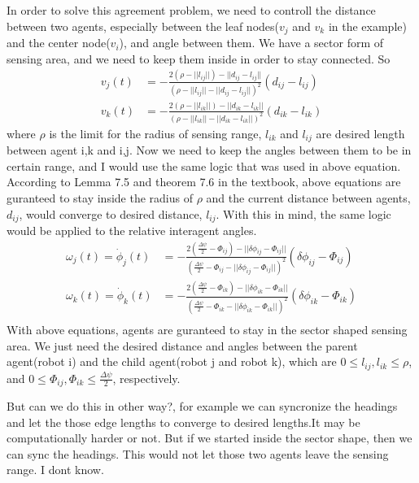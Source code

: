 \documentclass{article}
\begin{document}
\begin{problem}
    \vspace{12pt}
    In order to solve this agreement problem, we need to controll the distance between two agents, especially between the leaf nodes($v_j$ and $v_k$ in the example) and the center node($v_i$), and angle between them. We have a sector form of sensing area, and we need to keep them inside in order to stay connected. So 
    \begin{align*}
        v_j(t) &= - \frac{2(\rho - ||l_{ij}||) - ||d_{ij} - l_{ij}||}{(\rho - ||l_{ij}|| - ||d_{ij} - l_{ij}||)^2} (d_{ij} - l_{ij} )\\
        v_k(t) &= - \frac{2(\rho - ||l_{ik}||) - ||d_{ik} - l_{ik}||}{(\rho - ||l_{ik}|| - ||d_{ik} - l_{ik}||)^2} (d_{ik} - l_{ik} )
    \end{align*}
    where $\rho$ is the limit for the radius of sensing range, $l_{ik}$ and $l_{ij}$ are desired length between agent i,k and i,j.
    Now we need to keep the angles between them to be in certain range, and I would use the same logic that was used in above equation. According to Lemma 7.5 and theorem 7.6 in the textbook, above equations are guranteed to stay inside the radius of $\rho$ and the current distance between agents, $d_{ij}$, would converge to desired distance, $l_{ij}$. With this in mind, the same logic would be applied to the relative interagent angles. 
    \begin{align*}
        \omega_j(t) = \dot \phi_j(t) &= - \frac{2(\frac{\Delta \psi}{2} - \Phi_{ij}) - ||\delta \phi_{ij} - \Phi_{ij}||}{(\frac{\Delta \psi}{2} - \Phi_{ij} - ||\delta \phi_{ij} - \Phi_{ij}||)^2} (\delta \phi_{ij} - \Phi_{ij})\\
        \omega_k(t) = \dot \phi_k(t) &= - \frac{2(\frac{\Delta \psi}{2} - \Phi_{ik}) - ||\delta \phi_{ik} - \Phi_{ik}||}{(\frac{\Delta \psi}{2} - \Phi_{ik} - ||\delta \phi_{ik} - \Phi_{ik}||)^2} (\delta \phi_{ik} - \Phi_{ik})\\
    \end{align*}
    With above equations, agents are guranteed to stay in the sector shaped sensing area. We just need the desired distance and angles between the parent agent(robot i) and the child agent(robot j and robot k), which are $0 \leq l_{ij}, l_{ik} \leq \rho$, and $0 \leq \Phi_{ij}, \Phi_{ik} \leq \frac{\Delta \psi}{2}$, respectively. 

    But can we do this in other way?, for example we can syncronize the headings and let the those edge lengths to converge to desired lengths.It may be computationally harder or not. But if we started inside the sector shape, then we can sync the headings. This would not let those two agents leave the sensing range. I dont know. 
\end{problem}
\end{document}
